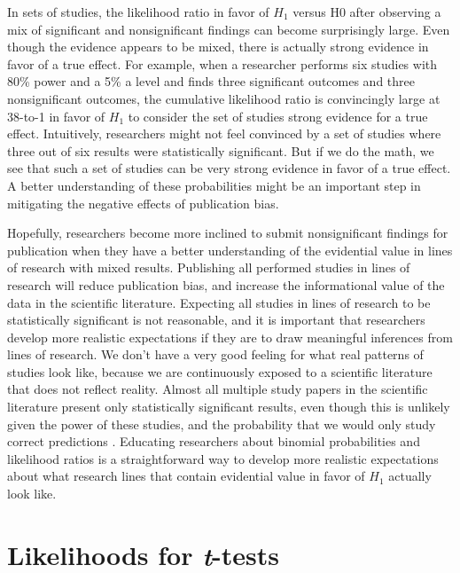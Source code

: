 \documentclass[
  oneside]{book}
\begin{document}
In sets of studies, the likelihood ratio in favor of \(H_1\) versus H0 after observing a mix of significant and nonsignificant findings can become surprisingly large. Even though the evidence appears to be mixed, there is actually strong evidence in favor of a true effect. For example, when a researcher performs six studies with 80\% power and a 5\% a level and finds three significant outcomes and three nonsignificant outcomes, the cumulative likelihood ratio is convincingly large at 38-to-1 in favor of \(H_1\) to consider the set of studies strong evidence for a true effect. Intuitively, researchers
might not feel convinced by a set of studies where three out of six results were statistically significant. But if we do the math, we see that such a set of studies can be very strong evidence in favor of a true effect. A better understanding of these probabilities might be an important step in mitigating the negative effects of publication bias.

Hopefully, researchers become more inclined to submit nonsignificant findings for publication when they have a better understanding of the evidential value in lines of research with mixed results. Publishing all performed studies in lines of research will reduce publication bias, and increase the informational value of the data in the scientific literature. Expecting all studies in lines of research to be statistically significant is not reasonable, and it is important that researchers develop more realistic expectations if they are to draw meaningful inferences from lines of research. We don't have a very good feeling for what real patterns of studies look like, because we are continuously exposed to a scientific literature that does not reflect reality. Almost all multiple study papers in the scientific literature present only statistically significant results, even though this is unlikely given the power of these studies, and the probability that we would only study correct predictions \citep{scheel_excess_2021}. Educating researchers about binomial probabilities and likelihood ratios is a straightforward way to develop more realistic expectations about what research lines that contain evidential value in favor of \(H_1\) actually look like.

\hypertarget{likettest}{%
\section{\texorpdfstring{Likelihoods for \emph{t}-tests}{Likelihoods for t-tests}}\label{likettest}}
\end{document}
